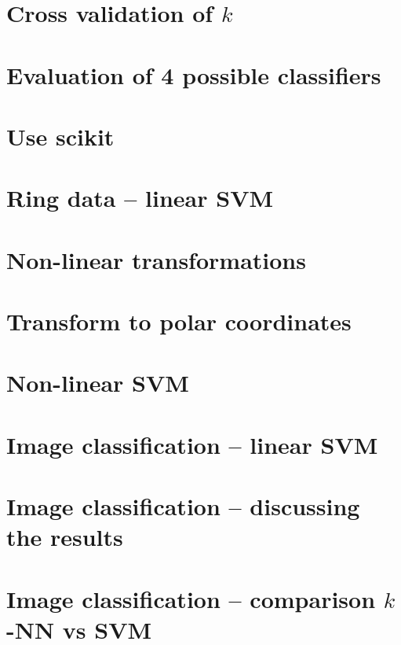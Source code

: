 \documentclass[a4paper,10pt,twoside]{article}
\begin{document}
\section{Cross validation of $k$}

\section{Evaluation of 4 possible classifiers}

\section{Use scikit}

\section{Ring data -- linear SVM}

\section{Non-linear transformations}

\section{Transform to polar coordinates}

\section{Non-linear SVM}

\section{Image classification -- linear SVM}

\section{Image classification -- discussing the results}

\section{Image classification -- comparison $k$-NN vs SVM}


%
%
\end{document}

